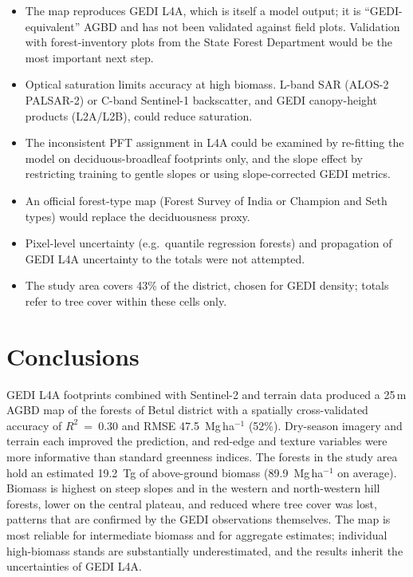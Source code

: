 \documentclass[11pt,a4paper]{article}
\newcommand{\mgha}{Mg\,ha$^{-1}$}
\newcommand{\rsq}{$R^2$}
\begin{document}
\begin{itemize}
  \item The map reproduces GEDI L4A, which is itself a model output; it is
        ``GEDI-equivalent'' AGBD and has not been validated against field plots. Validation
        with forest-inventory plots from the State Forest Department would be the most
        important next step.
  \item Optical saturation limits accuracy at high biomass. L-band SAR (ALOS-2 PALSAR-2) or
        C-band Sentinel-1 backscatter, and GEDI canopy-height products (L2A/L2B), could
        reduce saturation.
  \item The inconsistent PFT assignment in L4A could be examined by re-fitting the model on
        deciduous-broadleaf footprints only, and the slope effect by restricting training to
        gentle slopes or using slope-corrected GEDI metrics.
  \item An official forest-type map (Forest Survey of India or Champion and Seth types) would
        replace the deciduousness proxy.
  \item Pixel-level uncertainty (e.g.\ quantile regression forests) and propagation of GEDI
        L4A uncertainty to the totals were not attempted.
  \item The study area covers 43\% of the district, chosen for GEDI density; totals refer to
        tree cover within these cells only.
\end{itemize}

\section{Conclusions}

GEDI L4A footprints combined with Sentinel-2 and terrain data produced a 25\,m AGBD map of the
forests of Betul district with a spatially cross-validated accuracy of \rsq{}~=~0.30 and RMSE
47.5~\mgha{} (52\%). Dry-season imagery and terrain each improved the prediction, and red-edge
and texture variables were more informative than standard greenness indices. The forests in the
study area hold an estimated 19.2~Tg of above-ground biomass (89.9~\mgha{} on average). Biomass is
highest on steep slopes and in the western and north-western hill forests, lower on the central
plateau, and reduced where tree cover was lost, patterns that are confirmed by the GEDI
observations themselves. The map is most reliable for intermediate biomass and for aggregate
estimates; individual high-biomass stands are substantially underestimated, and the results
inherit the uncertainties of GEDI L4A.
\end{document}
